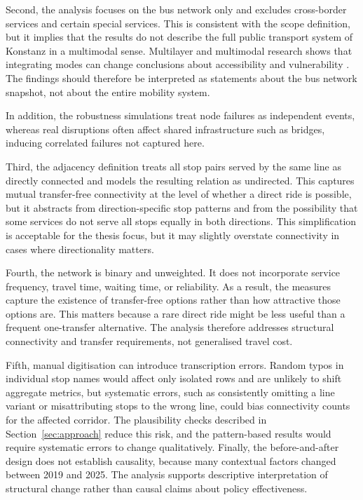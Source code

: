 \documentclass[12pt,a4paper,oneside]{report}
\begin{document}
Second, the analysis focuses on the bus network only and excludes cross-border services and certain special services.
This is consistent with the scope definition, but it implies that the results do not describe the full public transport system of Konstanz in a multimodal sense.
Multilayer and multimodal research shows that integrating modes can change conclusions about accessibility and vulnerability \citep{alessandretti2022}.
The findings should therefore be interpreted as statements about the bus network snapshot, not about the entire mobility system.

In addition, the robustness simulations treat node failures as independent events, whereas real disruptions often affect shared infrastructure such as bridges, inducing correlated failures not captured here.

Third, the adjacency definition treats all stop pairs served by the same line as directly connected and models the resulting relation as undirected.
This captures mutual transfer-free connectivity at the level of whether a direct ride is possible, but it abstracts from direction-specific stop patterns and from the possibility that some services do not serve all stops equally in both directions.
This simplification is acceptable for the thesis focus, but it may slightly overstate connectivity in cases where directionality matters.

Fourth, the network is binary and unweighted.
It does not incorporate service frequency, travel time, waiting time, or reliability.
As a result, the measures capture the existence of transfer-free options rather than how attractive those options are.
This matters because a rare direct ride might be less useful than a frequent one-transfer alternative.
The analysis therefore addresses structural connectivity and transfer requirements, not generalised travel cost.

Fifth, manual digitisation can introduce transcription errors.
Random typos in individual stop names would affect only isolated rows and are unlikely to shift aggregate metrics, but systematic errors, such as consistently omitting a line variant or misattributing stops to the wrong line, could bias connectivity counts for the affected corridor.
The plausibility checks described in Section~\ref{sec:approach} reduce this risk, and the pattern-based results would require systematic errors to change qualitatively.
Finally, the before-and-after design does not establish causality, because many contextual factors changed between 2019 and 2025.
The analysis supports descriptive interpretation of structural change rather than causal claims about policy effectiveness.
\end{document}
